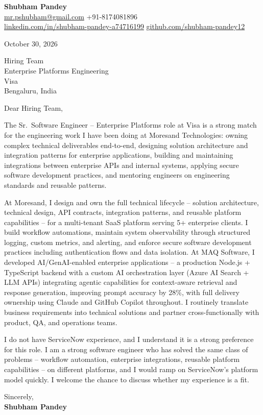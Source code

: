 \documentclass[a4paper,11pt]{article}
\begin{document}
\textbf{\Large Shubham Pandey}\\
\href{mailto:mr.pshubham@gmail.com}{mr.pshubham@gmail.com} \quad +91-8174081896\\
\href{https://www.linkedin.com/in/shubham-pandey-a74716199/}{linkedin.com/in/shubham-pandey-a74716199} \quad
\href{https://github.com/shubham-pandey12}{github.com/shubham-pandey12}

\vspace{1em}
October 30, 2026

\vspace{1em}
Hiring Team\\
Enterprise Platforms Engineering\\
Visa\\
Bengaluru, India

\vspace{1em}
Dear Hiring Team,

The Sr.\ Software Engineer -- Enterprise Platforms role at Visa is a strong match for the engineering work I have been doing at Moresand Technologies: owning complex technical deliverables end-to-end, designing solution architecture and integration patterns for enterprise applications, building and maintaining integrations between enterprise APIs and internal systems, applying secure software development practices, and mentoring engineers on engineering standards and reusable patterns.

At Moresand, I design and own the full technical lifecycle -- solution architecture, technical design, API contracts, integration patterns, and reusable platform capabilities -- for a multi-tenant SaaS platform serving 5+ enterprise clients. I build workflow automations, maintain system observability through structured logging, custom metrics, and alerting, and enforce secure software development practices including authentication flows and data isolation. At MAQ Software, I developed AI/GenAI-enabled enterprise applications -- a production Node.js + TypeScript backend with a custom AI orchestration layer (Azure AI Search + LLM APIs) integrating agentic capabilities for context-aware retrieval and response generation, improving prompt accuracy by 28\%, with full delivery ownership using Claude and GitHub Copilot throughout. I routinely translate business requirements into technical solutions and partner cross-functionally with product, QA, and operations teams.

I do not have ServiceNow experience, and I understand it is a strong preference for this role. I am a strong software engineer who has solved the same class of problems -- workflow automation, enterprise integrations, reusable platform capabilities -- on different platforms, and I would ramp on ServiceNow's platform model quickly. I welcome the chance to discuss whether my experience is a fit.

\vspace{1em}
Sincerely,\\[0.5em]
\textbf{Shubham Pandey}
\end{document}
